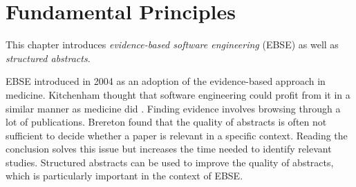 
\section {Fundamental Principles}
\label{sec:fundamental principles}
This chapter introduces \emph{evidence-based software engineering} (EBSE) as well as \emph{structured abstracts}.

EBSE introduced in 2004 as an adoption of the evidence-based approach in medicine. Kitchenham \etal thought that software engineering could profit from it in a similar manner as medicine did \cite{EBSE}.
Finding evidence involves browsing through a lot of publications.  Brereton \etal {} found that the quality of abstracts is often not sufficient to decide whether a paper  is relevant in a specific context. Reading the conclusion solves this issue but increases the time needed to identify relevant studies. Structured abstracts can be used to improve the quality of abstracts, which is particularly important in the context of EBSE.

